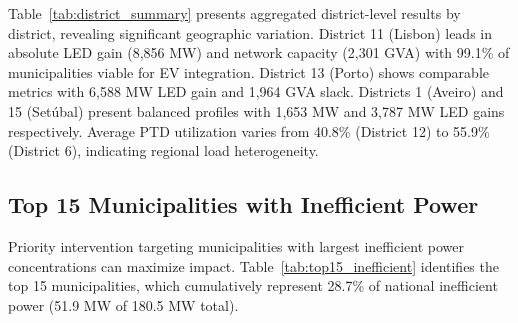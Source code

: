 \documentclass[conference]{IEEEtran}
\begin{document}
Table~\ref{tab:district_summary} presents aggregated district-level results by district, revealing significant geographic variation. District 11 (Lisbon) leads in absolute LED gain (8,856 MW) and network capacity (2,301 GVA) with 99.1\% of municipalities viable for EV integration. District 13 (Porto) shows comparable metrics with 6,588 MW LED gain and 1,964 GVA slack. Districts 1 (Aveiro) and 15 (Setúbal) present balanced profiles with 1,653 MW and 3,787 MW LED gains respectively. Average PTD utilization varies from 40.8\% (District 12) to 55.9\% (District 6), indicating regional load heterogeneity.

\begin{table}[htbp]
\centering
\caption{District-Level Summary Statistics (Selected Districts)}
\small
{}
\label{tab:district_summary}
\end{table}

\subsection{Top 15 Municipalities with Inefficient Power}

Priority intervention targeting municipalities with largest inefficient power concentrations can maximize impact. Table~\ref{tab:top15_inefficient} identifies the top 15 municipalities, which cumulatively represent 28.7\% of national inefficient power (51.9 MW of 180.5 MW total).
\end{document}
